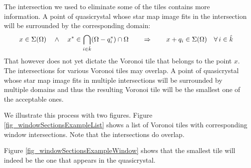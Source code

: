 \documentclass[text.tex]{subfiles}
\begin{document}
The intersection we used to eliminate some of the tiles contains more information. A point of quasicrystal whose star map image fits in the intersection will be surrounded by the corresponding domain: 
$$x\in\Sigma(\Omega) \quad\wedge\quad x^\ast\in\bigcap\limits_{i\in\hat{k}}(\Omega-q_i^\ast)\cap\Omega \qquad\Rightarrow\qquad x+q_i\in\Sigma(\Omega)\quad\forall\,i\in\hat{k}$$
That however does not yet dictate the Voronoi tile that belongs to the point $x$. The intersections for various Voronoi tiles may overlap. A point of quasicrystal whose star map image fits in multiple intersections will be surrounded by multiple domains and thus the resulting Voronoi tile will be the smallest one of the acceptable ones. 

We illustrate this process with two figures. Figure \ref{fig_windowSectionsExampleList} shows a list of Voronoi tiles with corresponding window intersections. Note that the intersections do overlap. 

Figure \ref{fig_windowSectionsExampleWindow} shows that the smallest tile will indeed be the one that appears in the quasicrystal. 
\end{document}
